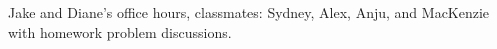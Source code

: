 \documentclass [12pt]{article}
\begin{document}
    




\begin{thebibliography}{1}
Jake and Diane's office hours, classmates: Sydney, Alex, Anju, and MacKenzie with homework problem discussions.
\end{thebibliography}
\end{document}
